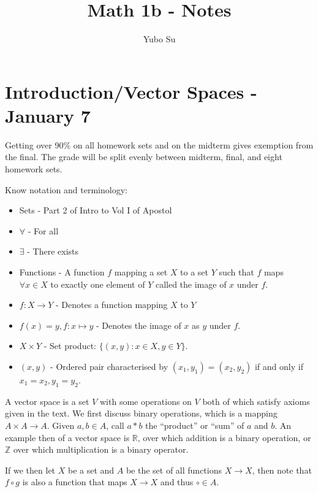 \documentclass{report}
\begin{document}
\title{Math 1b - Notes}
\author{Yubo Su}
\date{ }

\maketitle

\tableofcontents

\chapter{Introduction/Vector Spaces - January 7}

Getting over 90\% on all homework sets and on the midterm gives exemption from the final. The grade will be split evenly between midterm, final, and eight homework sets. 

Know notation and terminology:

\begin{itemize}
\item Sets - Part 2 of Intro to Vol I of Apostol
\item $\forall$ - For all
\item $\exists$ - There exists
\item Functions - A function $f$ mapping a set $X$ to a set $Y$ such that $f$ maps $\forall x \in X$ to exactly one element of $Y$ called the image of $x$ under $f$.
\item $f: X \to Y$ - Denotes a function mapping $X$ to $Y$
\item $f(x) = y, f: x \mapsto y$ - Denotes the image of $x$ as $y$ under $f$.
\item $X \times Y$ - Set product: $\{(x,y):x\in X, y \in Y\}$.
\item $(x,y)$ - Ordered pair characterised by $(x_1, y_1) = (x_2, y_2)$ if and only if $x_1 = x_2, y_1 = y_2$.
\end{itemize}

A vector space is a set $V$ with some operations on $V$ both of which satisfy axioms given in the text. We first discuss binary operations, which is a mapping $A \times A \to A$. Given $a,b \in A$, call $a*b$ the ``product'' or ``sum'' of $a$ and $b$. An example then of a vector space is $\mathbb{R}$, over which addition is a binary operation, or $\mathbb{Z}$ over which multiplication is a binary operator.

If we then let $X$ be a set and $A$ be the set of all functions $X \to X$, then note that $f \circ g$ is also a function that maps $X \to X$ and thus $\circ \in A$.
\end{document}
